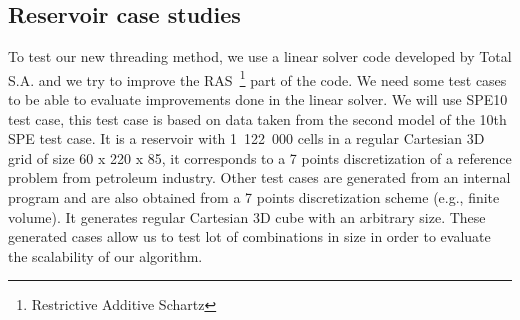 \subsection{Reservoir case studies}
To test our new threading method, we use a linear solver code developed by Total S.A. and we try to improve the RAS~\footnote{Restrictive Additive Schartz} part of the code.
%
We need some test cases to be able to evaluate improvements done in the linear solver.
%
We will use SPE10 test case, this test case is based on data taken from the second model of the 10th SPE test case\cite{SPE10}.
%
It is a reservoir with 1~122~000 cells in a regular Cartesian 3D grid of size 60 x 220 x 85, it corresponds to a 7 points discretization of a reference problem from petroleum industry.
%
Other test cases are generated from an internal program and are also obtained from a 7 points discretization scheme (e.g., finite volume).
%
It generates regular Cartesian 3D cube with an arbitrary size.
%
These generated cases allow us to test lot of combinations in size in order to evaluate the scalability of our algorithm.
